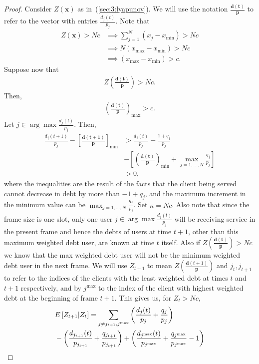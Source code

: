 \documentclass[letterpaper, 10 pt, conference]{ieeeconf}
\begin{document}
\begin{proof}
 Consider $Z(\bm{x}) $ as in~(\ref{sec:3:lyapunov}). We will use the notation $\bm{\frac{d(t)}{p}}$ to refer to the vector with entries $\frac{d_{j}(t)}{p_{j}}$. Note that
\begin{align*}
Z(\bm{x})>Nc &\implies \sum_{j=1}^{N}(x_{j}-x_{\min}) >Nc\\
&\implies N(x_{\max}-x_{\min}) >Nc\\
&\implies (x_{\max}-x_{\min}) >c.
\end{align*}
Suppose now that 
\begin{align*}
Z\left(\bm{\frac{d(t)}{p}}\right)>Nc.
\end{align*}
Then,
\begin{align*}
\left(\bm{\frac{d(t)}{p}}\right)_{\max} >c.
\end{align*}
Let $j\in \arg\max \frac{d_{j}(t) }{p_{j}} $. Then,
\begin{align*}
\frac{d_{j}(t+1) }{p_{j}} -\left[\bm{\frac{d(t+1)}{p}}\right]_{\min}&>   \frac{d_{j}(t) }{p_{j}} - \frac{1+q_{j}}{p_{j}}\\
& - \left[\left(\bm{\frac{d(t)}{p}}\right)_{\min} +\max_{j=1,\ldots,N}\frac{q_{j}}{p_{j}} \right]\\
&>0,
\end{align*}
where the inequalities are the result of the facts that the client being served cannot decrease in debt by more than $-1+q_{j}$, and the maximum increment in the minimum value can be $\max_{j=1,\ldots,N}\frac{q_{j}}{p_{j}} $.
Set $\kappa = Nc$. Also note that since the frame size is one slot, only one user $j\in \arg\max \frac{d_{j}(t) }{p_{j}} $ will be receiving service in the present frame and hence the debts of users at time $t+1$, other than this maximum weighted debt user, are known at time $t$ itself. Also if $Z\left(\bm{\frac{d(t)}{p}}\right)>Nc$ we know that the max weighted debt user will not be the minimum weighted debt user in the next frame. We will use $Z_{t+1}$ to mean $Z(\frac{\bm{d}(t+1)}{\bm{p}})$ and $j_{t},j_{t+1}$ to refer to the indices of the clients with the least weighted debt at times $t$ and $t+1$ respectively, and by $j^{\max} $ to the index of the client with highest weighted debt at the beginning of frame $t+1$. This gives us, for $Z_{t}>Nc$,
\begin{align}\label{sec:3:lypn1}
& E\left[ Z_{t+1} |   Z_{t}   \right] = \sum_{j\neq j_{t+1},j^{\max}} \left(\frac{d_{j}(t)}{p_{j}} + \frac{q_{j}}{p_{j}}\right) \notag\\
&-\left(\frac{d_{j_{t+1}}(t)}{p_{j_{t+1}}} + \frac{q_{j_{t+1}}}{p_{j_{t+1}}}\right)+ \left(\frac{d_{j^{\max}}(t)}{p_{j^{\max}}} + \frac{q_{j^{\max}}}{p_{j^{\max}}} -1\right)  \notag\\

\end{align}
\end{proof}
\end{document}
